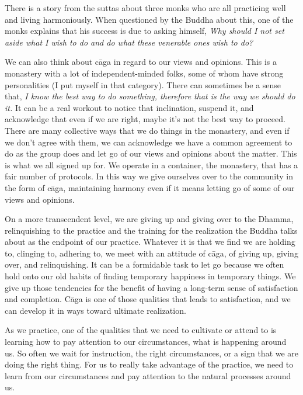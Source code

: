 There is a story from the suttas about three monks who are all 
practicing well and living harmoniously. When questioned by the Buddha 
about this, one of the monks explains that his success is due to asking 
himself, \emph{Why should I not set aside what I wish to do and do what 
these venerable ones wish to do?}

We can also think about cāga in regard to our views and opinions. This 
is a monastery with a lot of independent-minded folks, some of whom 
have strong personalities (I put myself in that category). There can 
sometimes be a sense that, \emph{I know the best way to do something, 
therefore that is the way we should do it.} It can be a real workout to 
notice that inclination, suspend it, and acknowledge that even if we 
are right, maybe it's not the best way to proceed. There are many 
collective ways that we do things in the monastery, and even if we 
don't agree with them, we can acknowledge we have a common agreement to 
do as the group does and let go of our views and opinions about the 
\mbox{matter.} This is what we all signed up for. We operate in a container, 
the monastery, that has a fair number of protocols. In this way we give 
ourselves over to the community in the form of cāga, maintaining 
harmony even if it means letting go of some of our views and opinions.

On a more transcendent level, we are giving up and giving over to the 
Dhamma, relinquishing to the practice and the training for the 
realization the Buddha talks about as the endpoint of our practice. 
Whatever it is that we find we are holding to, clinging to, adhering 
to, we meet with an attitude of cāga, of giving up, giving over, and 
relinquishing. It can be a formidable task to let go because we often 
hold onto our old habits of finding temporary happiness in temporary 
things. We give up those tendencies for the benefit of having a 
long-term sense of satisfaction and completion. Cāga is one of those 
qualities that leads to satisfaction, and we can develop it in ways 
toward ultimate realization.


As we practice, one of the qualities that we need to cultivate or 
attend to is learning how to pay attention to our circumstances, what 
is happening around us. So often we wait for instruction, the right 
circumstances, or a sign that we are doing the right thing. For us to 
really take advantage of the practice, we need to learn from our 
circumstances and pay attention to the natural processes around us.

